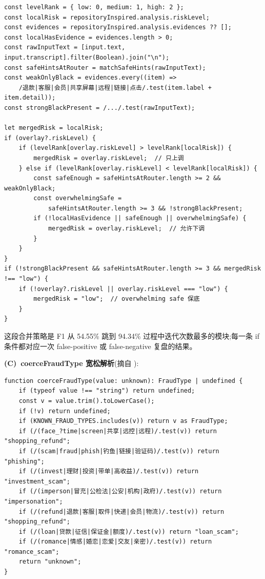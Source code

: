 \documentclass[UTF8,a4paper,12pt]{ctexart}
\newcommand{\codepath}[1]{\seqsplit{#1}}
\begin{document}
\begin{lstlisting}[language={}]
const levelRank = { low: 0, medium: 1, high: 2 };
const localRisk = repositoryInspired.analysis.riskLevel;
const evidences = repositoryInspired.analysis.evidences ?? [];
const localHasEvidence = evidences.length > 0;
const rawInputText = [input.text, input.transcript].filter(Boolean).join("\n");
const safeHintsAtRouter = matchSafeHints(rawInputText);
const weakOnlyBlack = evidences.every((item) =>
    /退款|客服|会员|共享屏幕|远程|链接|点击/.test(item.label + item.detail));
const strongBlackPresent = /.../.test(rawInputText);

let mergedRisk = localRisk;
if (overlay?.riskLevel) {
    if (levelRank[overlay.riskLevel] > levelRank[localRisk]) {
        mergedRisk = overlay.riskLevel;  // 只上调
    } else if (levelRank[overlay.riskLevel] < levelRank[localRisk]) {
        const safeEnough = safeHintsAtRouter.length >= 2 && weakOnlyBlack;
        const overwhelmingSafe =
            safeHintsAtRouter.length >= 3 && !strongBlackPresent;
        if (!localHasEvidence || safeEnough || overwhelmingSafe) {
            mergedRisk = overlay.riskLevel;  // 允许下调
        }
    }
}
if (!strongBlackPresent && safeHintsAtRouter.length >= 3 && mergedRisk !== "low") {
    if (!overlay?.riskLevel || overlay.riskLevel === "low") {
        mergedRisk = "low";  // overwhelming safe 保底
    }
}
\end{lstlisting}

这段合并策略是 F1 从 54.55\% 跳到 94.34\% 过程中迭代次数最多的模块;每一条 if 条件都对应一次 false-positive 或 false-negative 复盘的结果。

\textbf{(C)~coerceFraudType 宽松解析}(摘自 \codepath{server/anti-fraud-router.ts}):

\begin{lstlisting}[language={}]
function coerceFraudType(value: unknown): FraudType | undefined {
    if (typeof value !== "string") return undefined;
    const v = value.trim().toLowerCase();
    if (!v) return undefined;
    if (KNOWN_FRAUD_TYPES.includes(v)) return v as FraudType;
    if (/(face_?time|screen|共享|远控|远程)/.test(v)) return "shopping_refund";
    if (/(scam|fraud|phish|钓鱼|链接|验证码)/.test(v)) return "phishing";
    if (/(invest|理财|投资|带单|高收益)/.test(v)) return "investment_scam";
    if (/(imperson|冒充|公检法|公安|机构|政府)/.test(v)) return "impersonation";
    if (/(refund|退款|客服|取件|快递|会员|物流)/.test(v)) return "shopping_refund";
    if (/(loan|贷款|征信|保证金|额度)/.test(v)) return "loan_scam";
    if (/(romance|情感|婚恋|恋爱|交友|亲密)/.test(v)) return "romance_scam";
    return "unknown";
}
\end{lstlisting}
\end{document}
